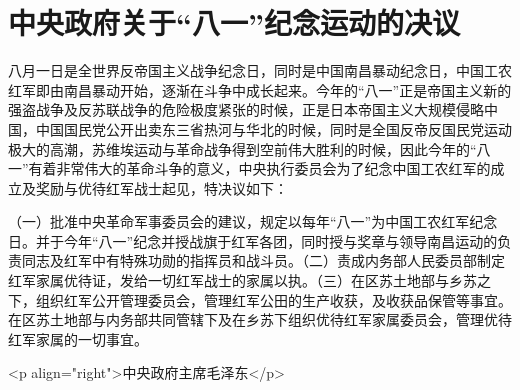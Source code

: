 \section[中央政府关于“八一”纪念运动的决议]{中央政府关于“八一”纪念运动的决议}


八月一日是全世界反帝国主义战争纪念日，同时是中国南昌暴动纪念日，中国工农红军即由南昌暴动开始，逐渐在斗争中成长起来。今年的“八一”正是帝国主义新的强盗战争及反苏联战争的危险极度紧张的时候，正是日本帝国主义大规模侵略中国，中国国民党公开出卖东三省热河与华北的时候，同时是全国反帝反国民党运动极大的高潮，苏维埃运动与革命战争得到空前伟大胜利的时候，因此今年的“八一”有着非常伟大的革命斗争的意义，中央执行委员会为了纪念中国工农红军的成立及奖励与优待红军战士起见，特决议如下：

（一）批准中央革命军事委员会的建议，规定以每年“八一”为中国工农红军纪念日。并于今年“八一”纪念并授战旗于红军各团，同时授与奖章与领导南昌运动的负责同志及红军中有特殊功勋的指挥员和战斗员。（二）责成内务部人民委员部制定红军家属优待证，发给一切红军战士的家属以执。（三）在区苏土地部与乡苏之下，组织红军公开管理委员会，管理红军公田的生产收获，及收获品保管等事宜。在区苏土地部与内务部共同管辖下及在乡苏下组织优待红军家属委员会，管理优待红军家属的一切事宜。

<p align="right">中央政府主席毛泽东</p>

